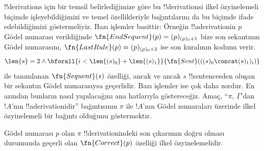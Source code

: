 \begin{explain}
!!{derivation}s için bir temsil belirlediğimize göre bu !!{derivation}s{}i
ilkel özyinelemeli biçimde işleyebildiğimizi ve temel özellikleriyle
bağıntılarını da bu biçimde ifade edebildiğimizi göstermeliyiz. Bazı işlemler
basittir: Örneğin !!a{derivation}{}in $p$ Gödel numarası verildiğinde
$\fn{EndSequent}(p) = (p)_{(p)_0+1}$ bize son sekantının Gödel numarasını,
$\fn{LastRule}(p) = (p)_{(p)_0+2}$ ise son kuralının kodunu verir.
\[
  \len{s} = 2 \land \bforall{i<\len{(s)_0} + \len{(s)_1}}{\fn{Sent}(((s)_0 \concat (s)_1)_i)}
\]
ile tanımlanan $\fn{Sequent}(s)$ özelliği, ancak ve ancak $s$ !!{sentence}s{}den
oluşan bir sekantın Gödel numarasıysa geçerlidir. Bazı işlemler ise çok daha
zordur. En azından bunların nasıl yapılacağını ana hatlarıyla göstereceğiz.
Amaç, ``$\pi$, $\Gamma$'dan $!A$'nın !!a{derivation}{}idir'' bağıntısının
$\pi$ ile $!A$'nın Gödel numaraları üzerinde ilkel özyinelemeli bir bağıntı
olduğunu göstermektir.
\end{explain}

\begin{prop}
  Gödel numarası $p$ olan $\pi$ !!{derivation}{}indeki son çıkarımın doğru
  olması durumunda geçerli olan $\fn{Correct}(p)$ özelliği ilkel
  özyinelemelidir.
\end{prop}

